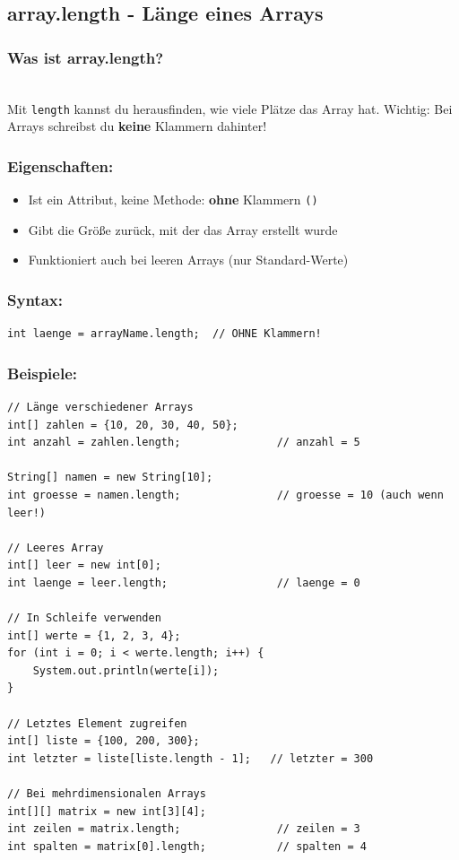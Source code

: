 \newpage


\subsection*{array.length - Länge eines Arrays}

\subsubsection*{Was ist array.length?}\\
Mit \texttt{length} kannst du herausfinden, wie viele Plätze das Array hat. Wichtig: Bei Arrays schreibst du \textbf{keine} Klammern dahinter!

\subsubsection*{Eigenschaften:}
\begin{itemize}
	\item Ist ein Attribut, keine Methode: \textbf{ohne} Klammern \texttt{()}
	\item Gibt die Größe zurück, mit der das Array erstellt wurde
	\item Funktioniert auch bei leeren Arrays (nur Standard-Werte)
\end{itemize}

\subsubsection*{Syntax:}
\begin{lstlisting}
int laenge = arrayName.length;  // OHNE Klammern!
\end{lstlisting}

\subsubsection*{Beispiele:}
\begin{lstlisting}
// Länge verschiedener Arrays
int[] zahlen = {10, 20, 30, 40, 50};
int anzahl = zahlen.length;               // anzahl = 5

String[] namen = new String[10];
int groesse = namen.length;               // groesse = 10 (auch wenn leer!)

// Leeres Array
int[] leer = new int[0];
int laenge = leer.length;                 // laenge = 0

// In Schleife verwenden
int[] werte = {1, 2, 3, 4};
for (int i = 0; i < werte.length; i++) {
    System.out.println(werte[i]);
}

// Letztes Element zugreifen
int[] liste = {100, 200, 300};
int letzter = liste[liste.length - 1];   // letzter = 300

// Bei mehrdimensionalen Arrays
int[][] matrix = new int[3][4];
int zeilen = matrix.length;               // zeilen = 3
int spalten = matrix[0].length;           // spalten = 4
\end{lstlisting}

